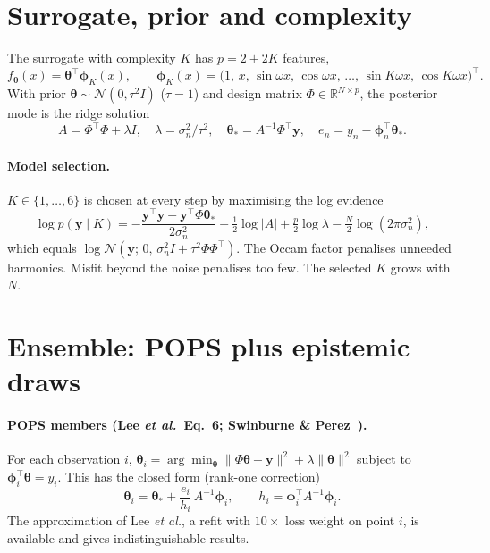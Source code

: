 \documentclass[11pt,a4paper]{article}
\newcommand{\R}{\mathbb{R}}
\newcommand{\N}{\mathcal{N}}
\newcommand{\btheta}{\bm{\theta}}
\newcommand{\bphi}{\bm{\phi}}
\newcommand{\by}{\mathbf{y}}
\begin{document}
\section{Surrogate, prior and complexity}
The surrogate with complexity $K$ has $p = 2+2K$ features,
\begin{equation}
f_{\btheta}(x) = \btheta^\top\bphi_K(x),\qquad
\bphi_K(x) = \bigl(1,\,x,\,\sin\omega x,\,\cos\omega x,\,\dots,\,\sin K\omega x,\,\cos K\omega x\bigr)^\top .
\end{equation}
With prior $\btheta\sim\N(0,\tau^2 I)$ ($\tau=1$) and design matrix $\Phi\in\R^{N\times p}$, the posterior mode is the ridge solution
\begin{equation}
A = \Phi^\top\Phi + \lambda I,\quad \lambda = \sigma_n^2/\tau^2,\quad \btheta_* = A^{-1}\Phi^\top\by,\quad e_n = y_n - \bphi_n^\top\btheta_* .
\end{equation}

\paragraph{Model selection.} $K\in\{1,\dots,6\}$ is chosen at every step by maximising the log evidence
\begin{equation}
\log p(\by\mid K) = -\frac{\by^\top\by - \by^\top\Phi\btheta_*}{2\sigma_n^2} - \tfrac12\log|A| + \tfrac p2\log\lambda - \tfrac N2\log(2\pi\sigma_n^2),
\end{equation}
which equals $\log\N(\by;\,0,\,\sigma_n^2 I + \tau^2\Phi\Phi^\top)$. The Occam factor penalises unneeded harmonics. Misfit beyond the
noise penalises too few. The selected $K$ grows with $N$.

\section{Ensemble: POPS plus epistemic draws}
\paragraph{POPS members (Lee \emph{et al.}\ Eq.~6; Swinburne \& Perez~\cite{pops2025}).} For each observation $i$,
$\btheta_i = \arg\min_{\btheta} \|\Phi\btheta-\by\|^2 + \lambda\|\btheta\|^2$ subject to $\bphi_i^\top\btheta = y_i$. This has the
closed form (rank-one correction)
\begin{equation}
\btheta_i = \btheta_* + \frac{e_i}{h_i}\,A^{-1}\bphi_i,\qquad h_i = \bphi_i^\top A^{-1}\bphi_i .
\end{equation}
The approximation of Lee \emph{et al.}, a refit with $10\times$ loss weight on point $i$, is available and gives indistinguishable results.
\end{document}
